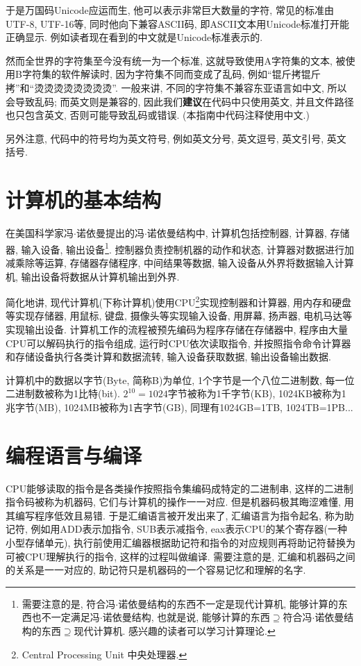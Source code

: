         于是万国码Unicode应运而生, 他可以表示非常巨大数量的字符, 常见的标准由UTF-8, UTF-16等, 同时他向下兼容ASCII码, 即ASCII文本用Unicode标准打开能正确显示. 例如读者现在看到的中文就是Unicode标准表示的.

        然而全世界的字符集至今没有统一为一个标准, 这就导致使用A字符集的文本, 被使用B字符集的软件解读时, 因为字符集不同而变成了乱码, 例如``锟斤拷锟斤拷''和``烫烫烫烫烫烫烫烫''. 一般来讲, 不同的字符集不兼容东亚语言如中文, 所以会导致乱码; 而英文则是兼容的, 因此我们\textbf{建议}在代码中只使用英文, 并且文件路径也只包含英文, 否则可能导致乱码或错误. (本指南中代码注释使用中文.)

        另外注意, 代码中的符号均为英文符号, 例如英文分号, 英文逗号, 英文引号, 英文括号.

    \section{计算机的基本结构} \label{计算机的基本结构}
        在美国科学家冯$\cdot$诺依曼提出的冯$\cdot$诺依曼结构中, 计算机包括控制器, 计算器, 存储器, 输入设备, 输出设备\footnote{需要注意的是, 符合冯$\cdot$诺依曼结构的东西不一定是现代计算机, 能够计算的东西也不一定满足冯$\cdot$诺依曼结构, 也就是说, 能够计算的东西$\supseteq$符合冯$\cdot$诺依曼结构的东西$\supseteq$现代计算机. 感兴趣的读者可以学习计算理论.}. 控制器负责控制机器的动作和状态, 计算器对数据进行加减乘除等运算, 存储器存储程序, 中间结果等数据, 输入设备从外界将数据输入计算机, 输出设备将数据从计算机输出到外界.
        
        简化地讲, 现代计算机(下称计算机)使用CPU\footnote{Central Processing Unit 中央处理器.}实现控制器和计算器, 用内存和硬盘等实现存储器, 用鼠标, 键盘, 摄像头等实现输入设备, 用屏幕, 扬声器, 电机马达等实现输出设备. 计算机工作的流程被预先编码为程序存储在存储器中, 程序由大量CPU可以解码执行的指令组成, 运行时CPU依次读取指令, 并按照指令命令计算器和存储设备执行各类计算和数据流转, 输入设备获取数据, 输出设备输出数据.

        计算机中的数据以字节(Byte, 简称B)为单位, 1个字节是一个八位二进制数, 每一位二进制数被称为1比特(bit). $ 2^{10} = 1024 $字节被称为1千字节(KB), 1024KB被称为1兆字节(MB), 1024MB被称为1吉字节(GB), 同理有1024GB=1TB, 1024TB=1PB...

    \section{编程语言与编译} \label{编程语言与编译}
        CPU能够读取的指令是各类操作按照指令集编码成特定的二进制串, 这样的二进制指令码被称为机器码, 它们与计算机的操作一一对应. 但是机器码极其晦涩难懂, 用其编写程序低效且易错. 于是汇编语言被开发出来了, 汇编语言为指令起名, 称为助记符, 例如用ADD表示加指令, SUB表示减指令, eax表示CPU的某个寄存器(一种小型存储单元), 执行前使用汇编器根据助记符和指令的对应规则再将助记符替换为可被CPU理解执行的指令, 这样的过程叫做编译. 需要注意的是, 汇编和机器码之间的关系是一一对应的, 助记符只是机器码的一个容易记忆和理解的名字.

